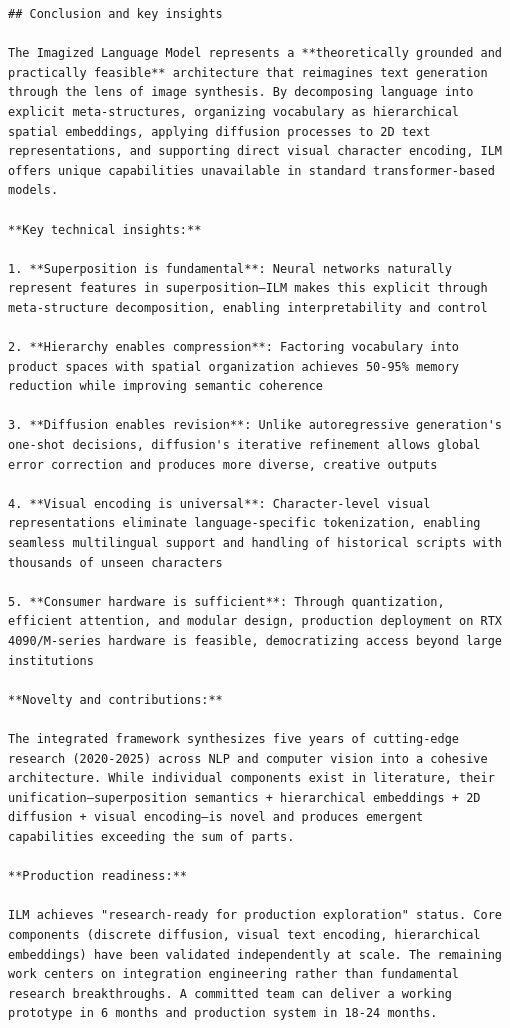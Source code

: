 \documentclass[11pt]{article}
\begin{document}
\begin{verbatim}
## Conclusion and key insights

The Imagized Language Model represents a **theoretically grounded and practically feasible** architecture that reimagines text generation through the lens of image synthesis. By decomposing language into explicit meta-structures, organizing vocabulary as hierarchical spatial embeddings, applying diffusion processes to 2D text representations, and supporting direct visual character encoding, ILM offers unique capabilities unavailable in standard transformer-based models.

**Key technical insights:**

1. **Superposition is fundamental**: Neural networks naturally represent features in superposition—ILM makes this explicit through meta-structure decomposition, enabling interpretability and control

2. **Hierarchy enables compression**: Factoring vocabulary into product spaces with spatial organization achieves 50-95% memory reduction while improving semantic coherence

3. **Diffusion enables revision**: Unlike autoregressive generation's one-shot decisions, diffusion's iterative refinement allows global error correction and produces more diverse, creative outputs

4. **Visual encoding is universal**: Character-level visual representations eliminate language-specific tokenization, enabling seamless multilingual support and handling of historical scripts with thousands of unseen characters

5. **Consumer hardware is sufficient**: Through quantization, efficient attention, and modular design, production deployment on RTX 4090/M-series hardware is feasible, democratizing access beyond large institutions

**Novelty and contributions:**

The integrated framework synthesizes five years of cutting-edge research (2020-2025) across NLP and computer vision into a cohesive architecture. While individual components exist in literature, their unification—superposition semantics + hierarchical embeddings + 2D diffusion + visual encoding—is novel and produces emergent capabilities exceeding the sum of parts.

**Production readiness:**

ILM achieves "research-ready for production exploration" status. Core components (discrete diffusion, visual text encoding, hierarchical embeddings) have been validated independently at scale. The remaining work centers on integration engineering rather than fundamental research breakthroughs. A committed team can deliver a working prototype in 6 months and production system in 18-24 months.


\end{verbatim}
\end{document}
